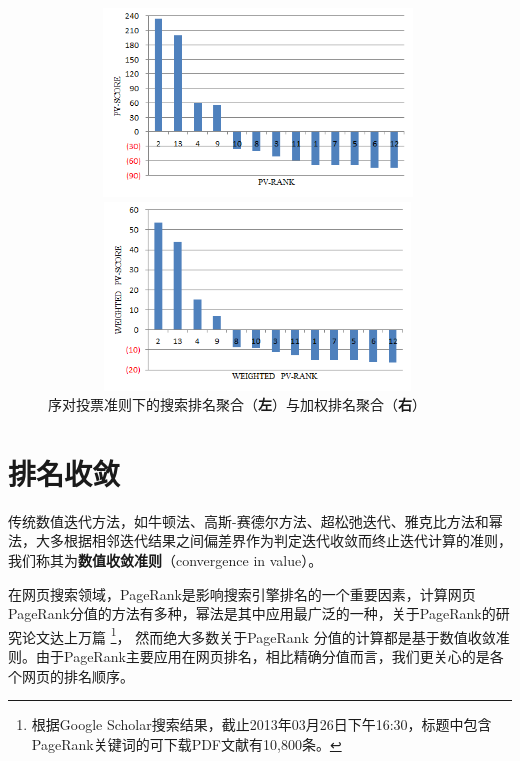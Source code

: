 \begin{figure}[ht]
    \begin{minipage}[t]{0.5\linewidth}
        \centering
          \includegraphics[width=0.99\textwidth,height=5cm]{figures/pv}
    \end{minipage}
    \begin{minipage}[t]{0.5\linewidth}
        \centering
          \includegraphics[width=0.99\textwidth,height=5cm]{figures/weightedpv}
    \end{minipage}\caption{序对投票准则下的搜索排名聚合（\textbf{左}）与加权排名聚合（\textbf{右}）}\label{fig:pvaggregation}
\end{figure}

\chapter{排名收敛}
传统数值迭代方法，如牛顿法、高斯-赛德尔方法、超松弛迭代、雅克比方法和幂法，大多根据相邻迭代结果之间偏差界作为判定迭代收敛而终止迭代计算的准则，我们称其为\textbf{数值收敛准则}（convergence in value）。

在网页搜索领域，PageRank是影响搜索引擎排名的一个重要因素，计算网页PageRank分值的方法有多种，幂法是其中应用最广泛的一种，关于PageRank的研究论文达上万篇
\footnote{根据Google Scholar搜索结果，截止2013年03月26日下午16:30，标题中包含PageRank关键词的可下载PDF文献有10,800条。}，
然而绝大多数关于PageRank 分值的计算都是基于数值收敛准则。由于PageRank主要应用在网页排名，相比精确分值而言，我们更关心的是各个网页的排名顺序。

